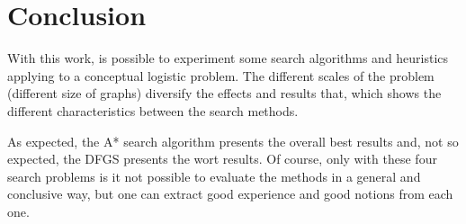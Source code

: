 \documentclass[a4paper]{article}
\begin{document}
\newpage

\section{Conclusion}

With this work, is possible to experiment some search algorithms and heuristics applying to a conceptual logistic problem. The different scales of the problem (different size of graphs) diversify the effects and results that, which shows the different characteristics between the search methods.

As expected,  the A* search algorithm presents the overall best results and, not so expected, the DFGS presents the wort results. Of course, only with these four search problems is it not possible to evaluate the methods in a general and conclusive way, but one can extract good experience and good notions from each one.





%
\end{document}
